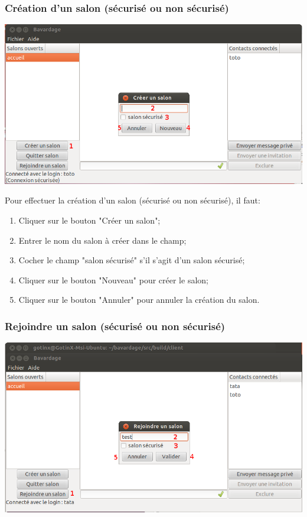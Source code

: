 \documentclass[a4paper,11pt,french]{book}
\begin{document}
\subsubsection{Création d'un salon (sécurisé ou non sécurisé)}

\includegraphics[width=45em]{capture/cre_room.png}

Pour effectuer la création d'un salon (sécurisé ou non sécurisé), il faut:
\begin{enumerate}
    \item Cliquer sur le bouton "Créer un salon";
    \item Entrer le nom du salon à créer dans le champ;
    \item Cocher le champ "salon sécurisé" s'il s'agit d'un salon sécurisé;
    \item Cliquer sur le bouton "Nouveau" pour créer le salon;
    \item Cliquer sur le bouton "Annuler" pour annuler la création du salon.
\end{enumerate}

\subsubsection{Rejoindre un salon (sécurisé ou non sécurisé)}

\includegraphics[width=45em]{capture/rej_sal.png}
\end{document}

